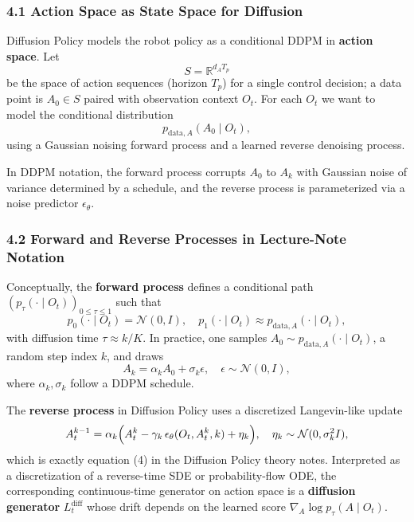 \documentclass[
]{article}
\theoremstyle{remark}
\begin{document}
\subsubsection{4.1 Action Space as State Space for
Diffusion}\label{action-space-as-state-space-for-diffusion}

Diffusion Policy models the robot policy as a conditional DDPM in
\textbf{action space}. Let \cite{diffpolicy-theory-notes,diffusion-policy2023} \[
 S = \mathbb{R}^{d_A T_p}
\] be the space of action sequences (horizon \(T_p\)) for a single
control decision; a data point is \(A_0 \in S\) paired with observation
context \(O_t\). For each \(O_t\) we want to model the conditional
distribution \cite{diffusion-policy2023,diffpolicy-theory-notes} \[
 p_{\text{data},A}(A_0 \mid O_t),
\] using a Gaussian noising forward process and a learned reverse
denoising process.

In DDPM notation, the forward process corrupts \(A_0\) to \(A_k\) with
Gaussian noise of variance determined by a schedule, and the reverse
process is parameterized via a noise predictor
\(\epsilon_\theta\). \cite{diffpolicy-theory-notes,diffusion-policy2023}

\subsubsection{4.2 Forward and Reverse Processes in Lecture-Note
Notation}\label{forward-and-reverse-processes-in-lecture-note-notation}

Conceptually, the \textbf{forward process} defines a conditional path
\((p_\tau(\cdot\mid O_t))_{0 \le \tau \le 1}\) such that \[
 p_0(\cdot\mid O_t) = \mathcal{N}(0, I), \quad p_1(\cdot\mid O_t) \approx p_{\text{data},A}(\cdot\mid O_t),
\] with diffusion time \(\tau \approx k/K\). In practice, one samples
\(A_0 \sim p_{\text{data},A}(\cdot\mid O_t)\), a random step index
\(k\), and draws \cite{lecnotes2026,diffpolicy-theory-notes} \[
 A_k = \alpha_k A_0 + \sigma_k \epsilon, \quad \epsilon \sim \mathcal{N}(0, I),
\] where \(\alpha_k, \sigma_k\) follow a DDPM
schedule. \cite{diffusion-policy-repo,diffpolicy-theory-notes}

The \textbf{reverse process} in Diffusion Policy uses a discretized
Langevin-like update \[
 A_t^{k-1} = \alpha_k\Bigl(A_t^k - \gamma_k \, \epsilon_\theta(O_t, A_t^k, k) + \eta_k\Bigr), \quad \eta_k \sim \mathcal{N}(0, \sigma_k^2 I),
\] which is exactly equation (4) in the Diffusion Policy theory notes.
Interpreted as a discretization of a reverse-time SDE or
probability-flow ODE, the corresponding continuous-time generator on
action space is a \textbf{diffusion generator} \(L_t^{\text{diff}}\)
whose drift depends on the learned score
\(\nabla_A \log p_\tau(A \mid O_t)\). \cite{diffusion-policy2023,diffpolicy-theory-notes,gm-companion-notes,lecnotes2026}
\end{document}
